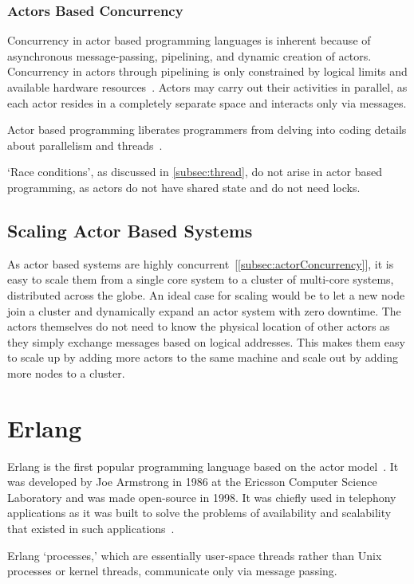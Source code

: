 \subsubsection{Actors Based Concurrency}
\label{subsec:actorConcurrency}
  Concurrency in actor based programming languages is inherent because of asynchronous message-passing, pipelining, and dynamic creation of actors. Concurrency in actors through pipelining is only constrained by logical limits and available hardware resources~\cite{agha}. Actors may carry out their activities in parallel, as each actor resides in a completely separate space and interacts only via messages.

  Actor based programming liberates programmers from delving into coding details about parallelism and threads~\cite{agha}.

  ‘Race conditions’, as discussed in \autoref{subsec:thread}, do not arise in actor based programming, as actors do not have shared state and do not need locks.

\subsection{Scaling Actor Based Systems}
  As actor based systems are highly concurrent~[\autoref{subsec:actorConcurrency}], it is easy to scale them from a single core system to a cluster of multi-core systems, distributed across the globe. An ideal case for scaling would be to let a new node join a cluster and dynamically expand an actor system with zero downtime. The actors themselves do not need to know the physical location of other actors as they simply exchange messages based on logical addresses. This makes them easy to scale up by adding more actors to the same machine and scale out by adding more nodes to a cluster.

\section{Erlang}
\label{sec:erlang}
  Erlang is the first popular programming language based on the actor model~\cite{vinoski}. It was developed by Joe Armstrong in 1986 at the Ericsson Computer Science Laboratory and was made open-source in 1998. It was chiefly used in telephony applications as it was built to solve the problems of availability and scalability that existed in such applications~\cite{armstrong}.

  Erlang ‘processes,’ which are essentially user-space threads rather than Unix processes or kernel threads, communicate only via message passing.~\cite{armstrong}

